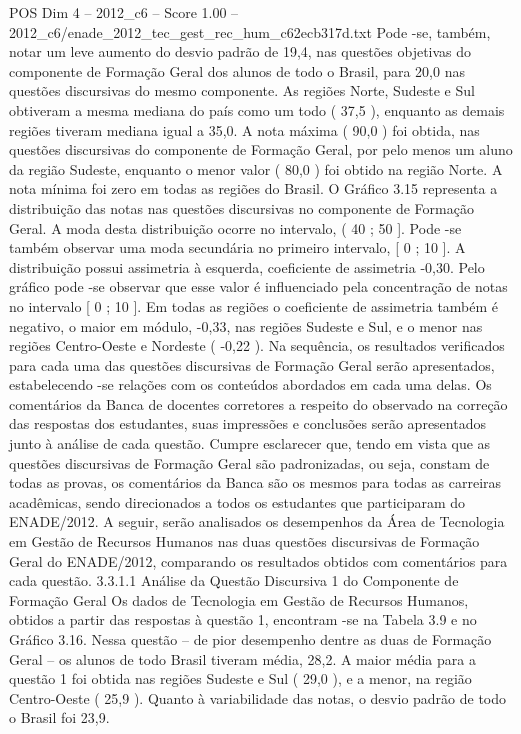\begin{textsample}{POS Dim 4 – 2012\_c6 – Score 1.00 – 2012\_c6/enade\_2012\_tec\_gest\_rec\_hum\_c62ecb317d.txt}
Pode -se, também, notar um leve aumento do desvio padrão de 19,4, nas questões objetivas do componente de Formação Geral dos alunos de todo o Brasil, para 20,0 nas questões discursivas do mesmo componente.
As regiões Norte, Sudeste e Sul obtiveram a mesma mediana do país como um todo ( 37,5 ), enquanto as demais regiões tiveram mediana igual a 35,0.
A nota máxima ( 90,0 ) foi obtida, nas questões discursivas do componente de Formação Geral, por pelo menos um aluno da região Sudeste, enquanto o menor valor ( 80,0 ) foi obtido na região Norte.
A nota mínima foi zero em todas as regiões do Brasil.
O Gráfico 3.15 representa a distribuição das notas nas questões discursivas no componente de Formação Geral.
A moda desta distribuição ocorre no intervalo, ( 40 ; 50 ].
Pode -se também observar uma moda secundária no primeiro intervalo, [ 0 ; 10 ].
A distribuição possui assimetria à esquerda, coeficiente de assimetria -0,30.
Pelo gráfico pode -se observar que esse valor é influenciado pela concentração de notas no intervalo [ 0 ; 10 ].
Em todas as regiões o coeficiente de assimetria também é negativo, o maior em módulo, -0,33, nas regiões Sudeste e Sul, e o menor nas regiões Centro-Oeste e Nordeste ( -0,22 ).
Na sequência, os resultados verificados para cada uma das questões discursivas de Formação Geral serão apresentados, estabelecendo -se relações com os conteúdos abordados em cada uma delas.
Os comentários da Banca de docentes corretores a respeito do observado na correção das respostas dos estudantes, suas impressões e conclusões serão apresentados junto à análise de cada questão.
Cumpre esclarecer que, tendo em vista que as questões discursivas de Formação Geral são padronizadas, ou seja, constam de todas as provas, os comentários da Banca são os mesmos para todas as carreiras acadêmicas, sendo direcionados a todos os estudantes que participaram do ENADE/2012.
A seguir, serão analisados os desempenhos da Área de Tecnologia em Gestão de Recursos Humanos nas duas questões discursivas de Formação Geral do ENADE/2012, comparando os resultados obtidos com comentários para cada questão. 3.3.1.1 Análise da Questão Discursiva 1 do Componente de Formação Geral Os dados de Tecnologia em Gestão de Recursos Humanos, obtidos a partir das respostas à questão 1, encontram -se na Tabela 3.9 e no Gráfico 3.16.
Nessa questão – de pior desempenho dentre as duas de Formação Geral – os alunos de todo Brasil tiveram média, 28,2.
A maior média para a questão 1 foi obtida nas regiões Sudeste e Sul ( 29,0 ), e a menor, na região Centro-Oeste ( 25,9 ).
Quanto à variabilidade das notas, o desvio padrão de todo o Brasil foi 23,9.

\end{textsample}
